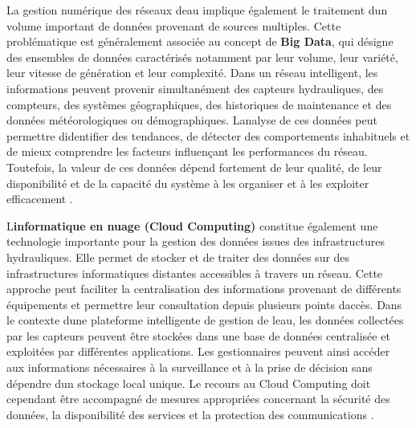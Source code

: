 \documentclass[12pt,a4paper,oneside]{report}
\begin{document}
La gestion numérique des réseaux d\textquotesingle eau implique
également le traitement d\textquotesingle un volume important de données
provenant de sources multiples. Cette problématique est généralement
associée au concept de \textbf{Big Data}, qui désigne des ensembles de
données caractérisés notamment par leur volume, leur variété, leur
vitesse de génération et leur complexité. Dans un réseau intelligent,
les informations peuvent provenir simultanément des capteurs
hydrauliques, des compteurs, des systèmes géographiques, des historiques
de maintenance et des données météorologiques ou démographiques.
L\textquotesingle analyse de ces données peut permettre
d\textquotesingle identifier des tendances, de détecter des
comportements inhabituels et de mieux comprendre les facteurs
influençant les performances du réseau. Toutefois, la valeur de ces
données dépend fortement de leur qualité, de leur disponibilité et de la
capacité du système à les organiser et à les exploiter efficacement
\cite{ref17}.

L\textquotesingle{}\textbf{informatique en nuage (Cloud Computing)}
constitue également une technologie importante pour la gestion des
données issues des infrastructures hydrauliques. Elle permet de stocker
et de traiter des données sur des infrastructures informatiques
distantes accessibles à travers un réseau. Cette approche peut faciliter
la centralisation des informations provenant de différents équipements
et permettre leur consultation depuis plusieurs points
d\textquotesingle accès. Dans le contexte d\textquotesingle une
plateforme intelligente de gestion de l\textquotesingle eau, les données
collectées par les capteurs peuvent être stockées dans une base de
données centralisée et exploitées par différentes applications. Les
gestionnaires peuvent ainsi accéder aux informations nécessaires à la
surveillance et à la prise de décision sans dépendre
d\textquotesingle un stockage local unique. Le recours au Cloud
Computing doit cependant être accompagné de mesures appropriées
concernant la sécurité des données, la disponibilité des services et la
protection des communications \cite{ref53}.
\end{document}
